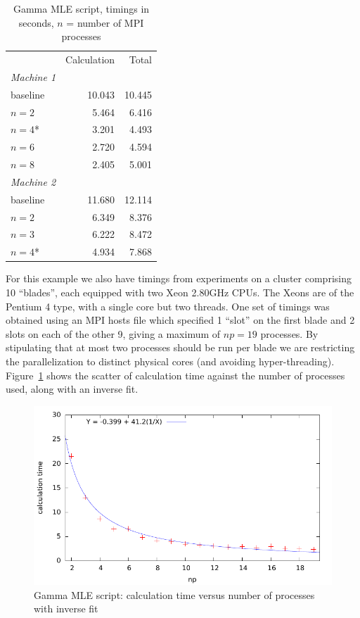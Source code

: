 \documentclass{article}
\begin{document}
\begin{table}[htbp]
\begin{center}
\begin{tabular}{lrr}
         & Calculation & Total \\
\textit{Machine 1} \\[2pt]
\quad baseline & 10.043 & 10.445 \\
\quad $n=2$ & 5.464 & 6.416 \\
\quad $n=4$* & 3.201 & 4.493 \\
\quad $n=6$ & 2.720 & 4.594 \\
\quad $n=8$ & 2.405 & 5.001 \\[2pt]
\textit{Machine 2} \\[2pt]
\quad baseline & 11.680 & 12.114 \\
\quad $n=2$ & 6.349 & 8.376 \\
\quad $n=3$ & 6.222 & 8.472 \\
\quad $n=4$* & 4.934 & 7.868
\end{tabular}
\end{center}
\caption{Gamma MLE script, timings in seconds, $n$ = number of MPI
  processes}
\label{tab:mle-timings}
\end{table}

For this example we also have timings from experiments on a cluster
comprising 10 ``blades'', each equipped with two Xeon 2.80GHz
CPUs. The Xeons are of the Pentium 4 type, with a single core but two
threads. One set of timings was obtained using an MPI hosts file which
specified 1 ``slot'' on the first blade and 2 slots on each of the
other 9, giving a maximum of $np=19$ processes. By stipulating that at
most two processes should be run per blade we are restricting the
parallelization to distinct physical cores (and avoiding
hyper-threading). Figure~\ref{fig:gamma-inverse} shows the scatter of
calculation time against the number of processes used, along with an
inverse fit.

\begin{figure}[htbp]
  \centering
  \includegraphics[scale=0.8]{figures/gamma-inverse}
  \caption{Gamma MLE script: calculation time versus number of
    processes with inverse fit}
  \label{fig:gamma-inverse}
\end{figure}
\end{document}

